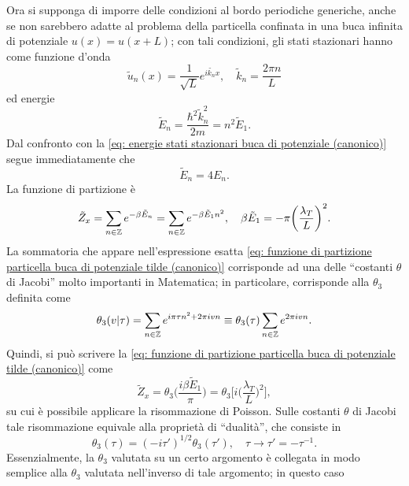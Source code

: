 Ora si supponga di imporre delle condizioni al bordo periodiche generiche, anche se non sarebbero adatte al problema della particella confinata in una buca infinita di potenziale $u(x) = u(x + L)$; con tali condizioni, gli stati stazionari hanno come funzione d'onda
\begin{equation}
    \tilde{u}_n(x) = \frac{1}{\sqrt{L}}e^{i\tilde{k_n}x},\quad \tilde{k}_n = \frac{2\pi n}{L}
\end{equation}
ed energie
\begin{equation}
    \tilde{E}_n = \frac{\hbar^2\tilde{k}_n^2}{2m} = n^2\tilde{E}_1.
\end{equation}
Dal confronto con la \eqref{eq: energie stati stazionari buca di potenziale (canonico)} segue immediatamente che
\begin{equation}
    \tilde{E}_n = 4E_n.
\end{equation}
La funzione di partizione è
\begin{equation}
\label{eq: funzione di partizione particella buca di potenziale tilde (canonico)}
    \tilde{Z}_x  =\sum_{n\in\mathbb{Z}}e^{-\beta \tilde{E}_n} = \sum_{n\in\mathbb{Z}}e^{-\beta \tilde{E}_1n^2},\quad \beta\tilde{E}_1 = -\pi\bigg(\frac{\lambda_T}{L}\bigg)^2.
\end{equation}
La sommatoria che appare nell'espressione esatta \eqref{eq: funzione di partizione particella buca di potenziale tilde (canonico)} corrisponde ad una delle ``costanti $\theta$ di Jacobi'' molto importanti in Matematica; in particolare, corrisponde alla $\theta_3$ definita come
\begin{equation}
\label{eq: definizione funzione theta3 di Jacobi}
    \theta_3(v|\tau) = \sum_{n\in\mathbb{Z}}e^{i\pi\tau n^2 + 2\pi ivn} \equiv \theta_3(\tau)\sum_{n\in\mathbb{Z}}e^{2\pi ivn}.
\end{equation}
Quindi, si può scrivere la \eqref{eq: funzione di partizione particella buca di potenziale tilde (canonico)} come 
\begin{equation}
    \tilde{Z}_x = \theta_3\bigg(\frac{i\beta\tilde{E}_1}{\pi}\bigg) = \theta_3\bigg[i\bigg(\frac{\lambda_T}{L}\bigg)^2\bigg],
\end{equation}
su cui è possibile applicare la risommazione di Poisson. Sulle costanti $\theta$ di Jacobi tale risommazione equivale alla proprietà di ``dualità'', che consiste in
\begin{equation}
    \theta_3(\tau) = (-i\tau')^{1/2}\theta_3(\tau'),\quad \tau \to \tau' = -\tau^{-1}.
\end{equation}
Essenzialmente, la $\theta_3$ valutata su un certo argomento è collegata in modo semplice alla $\theta_3$ valutata nell'inverso di tale argomento; in questo caso
